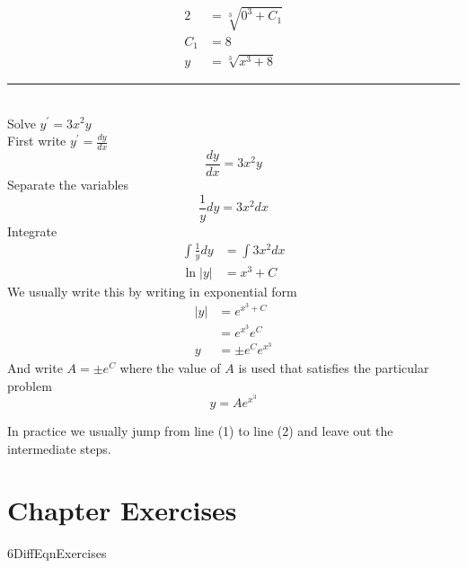 \begin{align*}2 &    = \sqrt[{3}]{0^{3} +C_{1}} \\
C_{1} &    = 8 \\
y &    = \sqrt[{3}]{x^{3} +8}\end{align*}
\rule{\textwidth}{0.5pt}\\
\example Solve $\displaystyle y^{ \prime } =3 x^{2} y$ \medskip\\
\solution First write $y^{ \prime } =\frac{d y}{d x}$ 
\begin{equation*}\frac{d y}{d x} =3 x^{2} y
\end{equation*}Separate the variables
\begin{equation*}\frac{1}{y} d y =3 x^{2} d x
\end{equation*}Integrate
\begin{align}\int \frac{1}{y} d y &    = \int 3 x^{2} d x \nonumber  \\
\ln  \left \vert y\right \vert  &    = x^{3} +C \tag{1}\end{align}We usually write this by writing in exponential form
\begin{align*}\left \vert y\right \vert  &    = e^{x^{3} +C} \\
 &    = e^{x^{3}} e^{C} \\
y &    =  \pm e^{C} e^{x^{3}}\end{align*}And write $A = \pm e^{C}$ where the value of $A$ is used that satisfies the particular problem
\begin{equation}y =A e^{x^{3}}\tag{2}
\end{equation}

In practice we usually jump from line (1) to line (2) and leave out the intermediate steps. 

\section{Chapter Exercises}
{6DiffEqnExercises}

